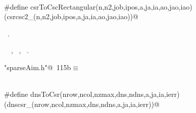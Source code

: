 \documentclass{article}
\begin{document}
\begin{description}
\begin{flushleft}
\begin{minipage}{\linewidth}
\begin{list}{}{} \item
\mbox{}\verb@@\\
\mbox{}\verb@#define csrToCscRectangular(n,n2,job,ipos,a,ja,ia,ao,jao,iao)\@\\
\mbox{}\verb@(csrcsc2_(n,n2,job,ipos,a,ja,ia,ao,jao,iao))@\\
\mbox{}\verb@@{\NWsep}
\end{list}
\vspace{-1.5ex}
\footnotesize
\begin{list}{}{\setlength{\itemsep}{-\parsep}\setlength{\itemindent}{-\leftmargin}}
\item \NWtxtFileDefBy\ .
\item \NWtxtIdentsUsed\nobreak\  \verb@ao@\nobreak\ , \verb@ia@\nobreak\ , \verb@job@\nobreak\ .
\item{}
\end{list}
\end{minipage}\vspace{4ex}
\end{flushleft}
\item[ convert dense to csr format]
\begin{flushleft} \small
\begin{minipage}{\linewidth}\label{scrap210}\raggedright\small
{} \verb@"sparseAim.h"@\nobreak\ {\footnotesize {115b}}$\equiv$
\vspace{-1ex}
\begin{list}{}{} \item
\mbox{}\verb@@\\
\mbox{}\verb@#define dnsToCsr(nrow,ncol,nzmax,dns,ndns,a,ja,ia,ierr)\@\\
\mbox{}\verb@(dnscsr_(nrow,ncol,nzmax,dns,ndns,a,ja,ia,ierr))@\\
\mbox{}\verb@@{\NWsep}
\end{list}

\end{minipage}
\end{flushleft}
\end{description}
\end{document}

